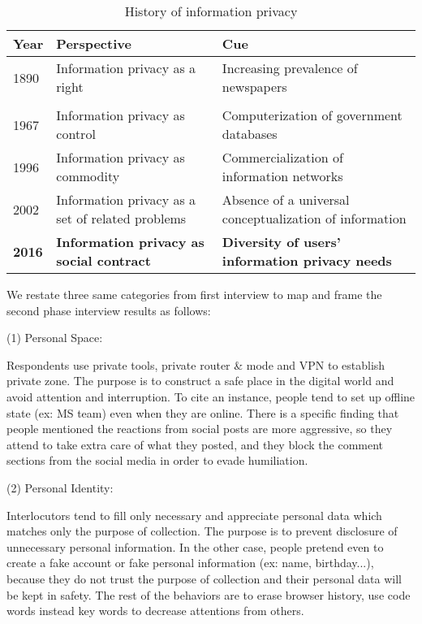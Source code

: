 \begin{table}[H]
    \centering
    \begin{tabular}{ |p{1cm}|p{7cm}|p{7cm}|  }
\hline
    Year & Perspective & Cue \\
\hline
\hline
     1890 & Information privacy as a right \cite{seven} & Increasing prevalence of newspapers\\
     & & \\
\hline
     1967 & Information privacy as control \cite{table2} & Computerization of government databases\\
\hline
    1996 & Information privacy as commodity \cite{priv_goals} & Commercialization of information networks\\
\hline
    2002 & Information privacy as a set of related problems \cite{table4} & Absence of a universal conceptualization of information\\
\hline
    \textbf{2016} & \textbf{Information privacy as social contract} \cite{table5} & \textbf{Diversity of users' information privacy needs}\\
\hline
    \end{tabular}
    \caption{History of information privacy \cite{cii}}
    \label{tab:meng_t1}
\end{table}

We restate three same categories from first interview to map and frame the second phase interview results as follows: 

(1) Personal Space:

Respondents use private tools, private router & mode and VPN to establish private zone. The purpose is to construct a safe place in the digital world and avoid attention and interruption. To cite an instance, people tend to set up offline state (ex: MS team) even when they are online. There is a specific finding that people mentioned the reactions from social posts are more aggressive, so they attend to take extra care of what they posted, and they block the comment sections from the social media in order to evade humiliation. 

(2) Personal Identity:

Interlocutors tend to fill only necessary and appreciate personal data which matches only the purpose of collection. The purpose is to prevent disclosure of unnecessary personal information. In the other case, people pretend even to create a fake account or fake personal information (ex: name, birthday...), because they do not trust the purpose of collection and their personal data will be kept in safety. The rest of the behaviors are to erase browser history, use code words instead key words to decrease attentions from others. 

